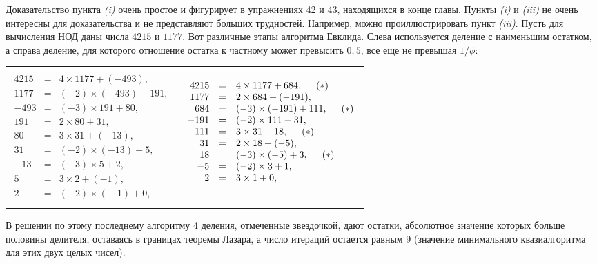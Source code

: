 \documentclass{mai_book}
\begin{document}
\begin{myproof}
Доказательство пункта \textit{(i)} очень простое и фигурирует в упражне­ниях 42 и 43, находящихся в конце главы. Пункты \textit{(i)} и \textit{(iii)} не очень
интересны для доказательства и не представляют больших трудно­стей. Например, можно проиллюстрировать пункт \textit{(iii)}. Пусть для
вычисления НОД даны числа $4215$ и $1177$. Вот различные этапы ал­горитма Евклида. Слева используется деление с наименьшим остат­ком, а справа деление, для которого отношение остатка к частному
может превысить $0,5$, все еще не превышая $1/\phi$:

\begin{tabular}{c|c}

$\begin{array}{rcl}
\;\\
4215 & = & 4 \times 1177 + (-493),\\
1177 & = & (-2 )\times(-493)+191,\\
-493 & = & (-3)\times 191+80,\\
191  & = & 2\times 80+31,\\
80   & = & 3\times 31+(-13),\\
31   & = & (-2)\times(-13)+5,\\
-13  & = &(-3)\times 5+2,\\
5    & = & 3\times 2+(-1),\\
2    & = & (-2)\times(—1)+0,\\
\;
\end{array}$ &
$\begin{array}{rcl}
\;\\
4215 &=& 4 \times 1177 + 684,\hspace*{0.5cm}(*)\\
1177 &=& 2\times 684 + (-191),\\
684 & = & (-3)\times (-191)+111,\hspace*{0.5cm}(*)\\
-191  & = & (-2)\times 111+31,\\
111 & = & 3\times 31+18,\hspace*{0.5cm}(*)\\
31   & = & 2\times 18+(-5),\\
18  & = &(-3)\times(-5)+3,\hspace*{0.5cm}(*)\\
-5    & = & (-2)\times 3+1,\\
2    & = & 3\times1+0,\\
\;
\end{array}$
\end{tabular}
В решении по этому последнему алгоритму 4 деления, отмеченные
звездочкой, дают остатки, абсолютное значение которых больше
половины делителя, оставаясь в границах теоремы Лазара, а число
итераций остается равным 9 (значение минимального квазиалгоритма для этих двух целых чисел).
\end{myproof}
\end{document}
